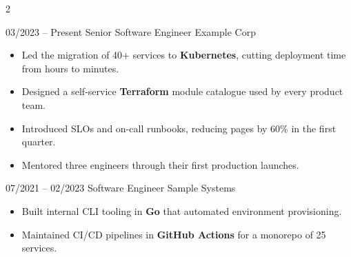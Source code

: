 {{{{{{{{{{{{{{{{{\begin{paracol}{2}
\begin{rightcolumn}

%
%

\vspace{4pt}
\vspace{2pt}

\cvevent
{03/2023 -- Present}
	{Senior Software Engineer}
	{Example Corp}
	{
	\begin{itemize}[leftmargin=*,topsep=0pt,itemsep=0pt,parsep=0pt]
		\item Led the migration of 40+ services to \textbf{Kubernetes}, cutting deployment time from hours to minutes.
		\item Designed a self-service \textbf{Terraform} module catalogue used by every product team.
		\item Introduced SLOs and on-call runbooks, reducing pages by 60\% in the first quarter.
		\item Mentored three engineers through their first production launches.
	\end{itemize}
	}

\cvevent
{07/2021 -- 02/2023}
	{Software Engineer}
	{Sample Systems}
	{
	\begin{itemize}[leftmargin=*,topsep=0pt,itemsep=0pt,parsep=0pt]
		\item Built internal CLI tooling in \textbf{Go} that automated environment provisioning.
		\item Maintained CI/CD pipelines in \textbf{GitHub Actions} for a monorepo of 25 services.
	\end{itemize}
	}


\end{rightcolumn}
\end{paracol}}}}}}}}}}}}}}}}}}
